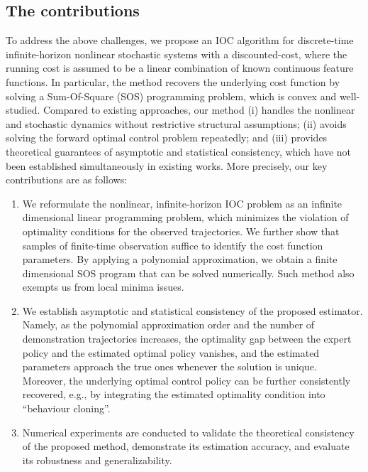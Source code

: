 \subsection{The contributions}
To address the above challenges, we propose an IOC algorithm for discrete-time infinite-horizon nonlinear stochastic systems with a discounted-cost, where the running cost is assumed to be a linear combination of known continuous feature functions.
In particular, the method recovers the underlying cost function by solving a Sum-Of-Square (SOS) programming problem, which is convex and well-studied. 
Compared to existing approaches, our method
(i) handles the nonlinear and stochastic dynamics without restrictive structural assumptions;
(ii) avoids solving the forward optimal control problem repeatedly; and 
(iii) provides theoretical guarantees of asymptotic and statistical consistency, which have not been established simultaneously in existing works.
More precisely, our key contributions are as follows:
\begin{enumerate}[label=\roman*.]
    \item We reformulate the nonlinear, infinite-horizon IOC problem as an infinite dimensional linear programming problem, which minimizes the violation of optimality conditions for the observed trajectories. We further show that samples of finite-time observation suffice to identify the cost function parameters. By applying a polynomial approximation, we obtain a finite dimensional SOS program that can be solved numerically. Such method also exempts us from local minima issues.
    \item We establish asymptotic and statistical consistency of the proposed estimator. Namely, as the polynomial approximation order and the number of demonstration trajectories increases, the optimality gap between the expert policy and the estimated optimal policy vanishes, and the estimated parameters approach the true ones whenever the solution is unique. Moreover, the underlying optimal control policy can be further consistently recovered, e.g., by integrating the estimated optimality condition into ``behaviour cloning''.
    \item Numerical experiments are conducted to validate the theoretical consistency of the proposed method, demonstrate its estimation accuracy, and evaluate its robustness and generalizability.
\end{enumerate}


